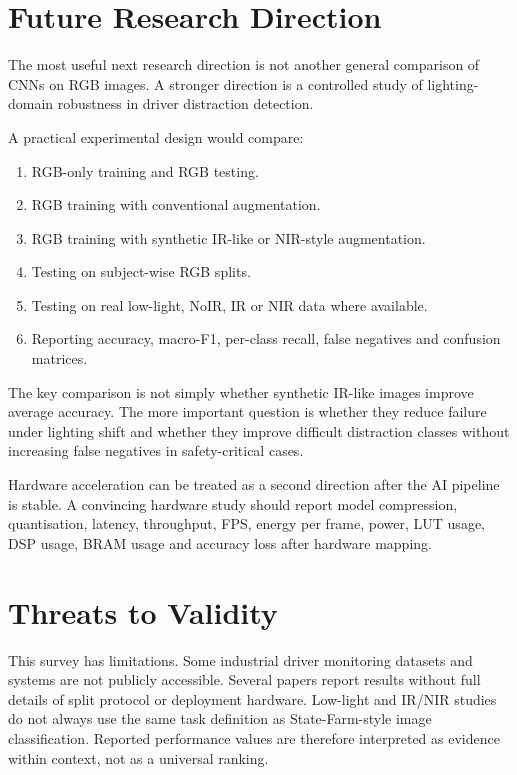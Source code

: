 \documentclass[11pt,a4paper]{article}
\let\oldsection\section
\renewcommand{\section}{\FloatBarrier\Needspace{9\baselineskip}\oldsection}
\begin{document}
\section{Future Research Direction}

The most useful next research direction is not another general comparison of CNNs on RGB images. A stronger direction is a controlled study of lighting-domain robustness in driver distraction detection.

A practical experimental design would compare:

\begin{enumerate}
    \item RGB-only training and RGB testing.
    \item RGB training with conventional augmentation.
    \item RGB training with synthetic IR-like or NIR-style augmentation.
    \item Testing on subject-wise RGB splits.
    \item Testing on real low-light, NoIR, IR or NIR data where available.
    \item Reporting accuracy, macro-F1, per-class recall, false negatives and confusion matrices.
\end{enumerate}

The key comparison is not simply whether synthetic IR-like images improve average accuracy. The more important question is whether they reduce failure under lighting shift and whether they improve difficult distraction classes without increasing false negatives in safety-critical cases.

Hardware acceleration can be treated as a second direction after the AI pipeline is stable. A convincing hardware study should report model compression, quantisation, latency, throughput, FPS, energy per frame, power, LUT usage, DSP usage, BRAM usage and accuracy loss after hardware mapping.

\section{Threats to Validity}

This survey has limitations. Some industrial driver monitoring datasets and systems are not publicly accessible. Several papers report results without full details of split protocol or deployment hardware. Low-light and IR/NIR studies do not always use the same task definition as State-Farm-style image classification. Reported performance values are therefore interpreted as evidence within context, not as a universal ranking.
\end{document}
